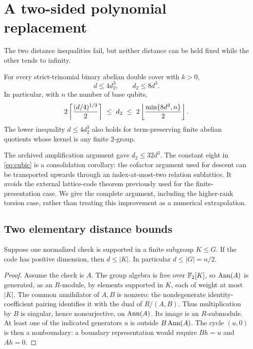 \section{A two-sided polynomial replacement}
\label{sec:polynomial}
The two distance inequalities fail, but neither distance can be held fixed while the other tends to infinity.

\begin{theorem}\label{thm:polynomial}
For every strict-trinomial binary abelian double cover with $k>0$,
\begin{equation}\label{eq:cubic}
 \boxed{d\le4d_2^3,\qquad d_2\le8d^3.}
\end{equation}
In particular, with $n$ the number of base qubits,
\begin{equation}\label{eq:basic-interval}
 2\left\lceil \frac{(d/4)^{1/3}}2\right\rceil
 \ \le\ d_2\ \le\ 2\left\lfloor \frac{\min\{8d^3,n\}}2\right\rfloor.
\end{equation}
The lower inequality $d\le4d_2^3$ also holds for term-preserving finite abelian quotients whose kernel is any finite $2$-group.
\end{theorem}
The archived amplification argument gave $d_2\le32d^3$. The constant eight in \eqref{eq:cubic} is a consolidation corollary: the cofactor argument used for descent can be transported upwards through an index-at-most-two relation sublattice. It avoids the external lattice-code theorem previously used for the finite-presentation case. We give the complete argument, including the higher-rank torsion case, rather than treating this improvement as a numerical extrapolation.

\subsection{Two elementary distance bounds}
\begin{lemma}\label{lem:finite-check}
Suppose one normalized check is supported in a finite subgroup $K\le G$. If the code has positive dimension, then $d\le|K|$. In particular $d\le|G|=n/2$.
\end{lemma}
\begin{proof}
Assume the check is $A$. The group algebra is free over $\mathbb F_2[K]$, so $\operatorname{Ann}(A)$ is generated, as an $R$-module, by elements supported in $K$, each of weight at most $|K|$. The common annihilator of $A,B$ is nonzero: the nondegenerate identity-coefficient pairing identifies it with the dual of $R/(A,B)$. Thus multiplication by $B$ is singular, hence nonsurjective, on $\operatorname{Ann}(A)$. Its image is an $R$-submodule. At least one of the indicated generators $u$ is outside $B\operatorname{Ann}(A)$. The cycle $(u,0)$ is then a nonboundary: a boundary representation would require $Bh=u$ and $Ah=0$.
\end{proof}

